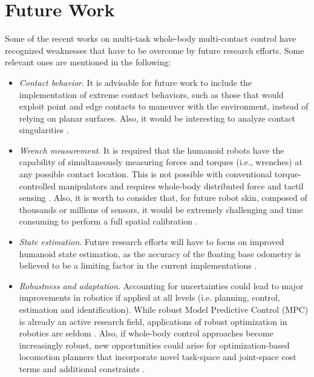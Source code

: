 \section{Future Work}
	\label{sec:future_work}
	
	Some of the recent works on multi-task whole-body multi-contact control have recognized weaknesses
	that have to be overcome by future research efforts.
	Some relevant ones are mentioned in the following:
	\begin{itemize}
					
		\item \emph{Contact behavior}.
					It is advisable for future work to include the implementation of extreme contact behaviors,
					such as those that would exploit point and edge contacts to maneuver with the environment,
					instead of relying on planar surfaces.
					Also, it would be interesting to analyze contact singularities \cite{Sentis_TransRobotics2010}.
					
		\item \emph{Wrench measurement}.
					It is required that the humanoid robots have the capability of simultaneously measuring forces
					and	torques (i.e., wrenches) at any possible contact location.
					This is not possible with conventional torque-controlled manipulators and requires whole-body
					distributed force and tactil sensing \cite{Nori_FrontRobAI2015}.
					Also, it is worth to consider that, for future robot skin, composed of thousands or millions
					of sensors, it would be extremely challenging and time consuming to perform a full spatial
					calibration \cite{Calandra_Humanoids2015}.
		
		\item \emph{State estimation}.
					Future research efforts will have to focus on improved humanoid state estimation, as the
					accuracy of the floating base odometry is believed to be a limiting factor in the current
					implementations	\cite{Hopkins_IJHR2016}.
					
		\item \emph{Robustness and adaptation}.
					Accounting for uncertainties could lead to major improvements in robotics if applied at all
					levels (i.e. planning, control, estimation and identification).
					While robust Model Predictive Control (MPC) is already an active research field, applications
					of robust optimization in robotics are seldom \cite{DelPrete_LAAS2015}.
					Also, if whole-body control approaches become increasingly robust, new opportunities could
					arise for optimization-based locomotion planners that incorporate novel task-space and
					joint-space cost terms and additional constraints \cite{Hopkins_IJHR2016}.
					

\end{itemize}
